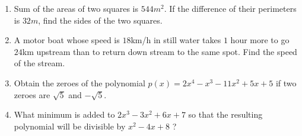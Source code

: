 \begin{enumerate}
\item
	Sum of the areas of two squares is $544 m^2$. If the difference of their
perimeters is $32 m$, find the sides of the two squares.

\item
	A motor boat whose speed is $18$km/h in still water takes $1$ hour more to 
go $24$km upstream than to return down stream to the same spot. Find the speed of the stream.

\item Obtain the zeroes of the polynomial
$p(x) = 2x^4 - x^3 - 11x^2 + 5x + 5$ if two zeroes are $\sqrt5$ and $-\sqrt5$.

\item What minimum is added to $2x^3 - 3x^2 + 6x + 7$ so that the resulting
polynomial will be divisible by $x^2 - 4x + 8$ ?
\end{enumerate}
